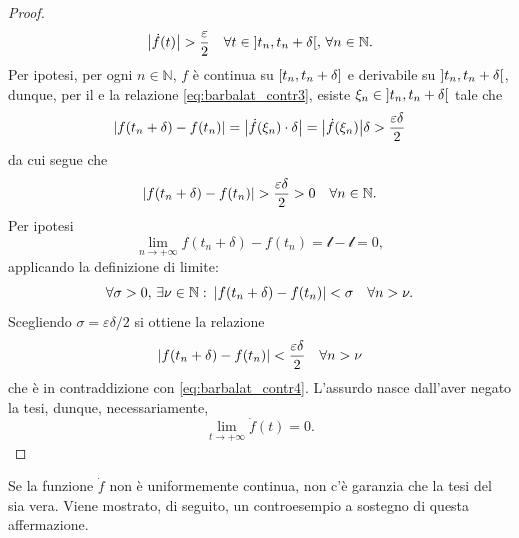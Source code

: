 \documentclass[a4paper,12pt]{article}
\begin{document}
\begin{proof}
\begin{equation}
    \mleft| \dot{f}(t) \mright| > \frac{\varepsilon}{2} \quad \forall t \in \interval[open]{t_n}{t_n + \delta}, \,\forall n \in \mathbb{N}.
  \end{equation}
  Per ipotesi, per ogni $n \in \mathbb{N}$, $f$ è continua su $\interval{t_n}{t_n + \delta}$ e derivabile su $\interval[open]{t_n}{t_n + \delta}$, dunque, per il  e la relazione \eqref{eq:barbalat_contr3}, esiste $\xi_n \in \interval[open]{t_n}{t_n + \delta}$ tale che
  \begin{equation*}
    \mleft|f(t_n + \delta) - f(t_n)\mright| = \mleft|\dot{f}(\xi_n) \cdot \delta \mright| = \mleft|\dot{f}(\xi_n)\mright| \delta > \frac{\varepsilon\delta}{2}
  \end{equation*}
  da cui segue che
  \begin{equation}\label{eq:barbalat_contr4}
    \mleft|f(t_n + \delta) - f(t_n)\mright| > \frac{\varepsilon\delta}{2} > 0 \quad \forall n \in \mathbb{N}.
  \end{equation}
  Per ipotesi
  \[
  \lim_{n \to +\infty} f(t_n + \delta) - f(t_n) = \mathscr{l} - \mathscr{l} = 0,
  \]
  applicando la definizione di limite:
  \begin{equation*}
    \forall \sigma > 0, \, \exists \nu \in \mathbb{N} \, \colon \, \mleft|f(t_n + \delta) - f(t_n)\mright| < \sigma \quad \forall n > \nu. 
  \end{equation*}
  Scegliendo $\sigma = \varepsilon\delta/2$ si ottiene la relazione
  \begin{equation*}
    \mleft|f(t_n + \delta) - f(t_n)\mright| < \frac{\varepsilon\delta}{2} \quad \forall n > \nu
  \end{equation*}
  che è in contraddizione con \eqref{eq:barbalat_contr4}. L'assurdo nasce dall'aver negato la tesi, dunque, necessariamente, 
  \[
  \lim_{t \to + \infty} \dot{f}(t) = 0.
  \]
\end{proof}

\medskip
Se la funzione $\dot{f}$ non è uniformemente continua, non c'è garanzia che la tesi del  sia vera. Viene mostrato, di seguito, un controesempio a sostegno di questa affermazione.
\end{document}
